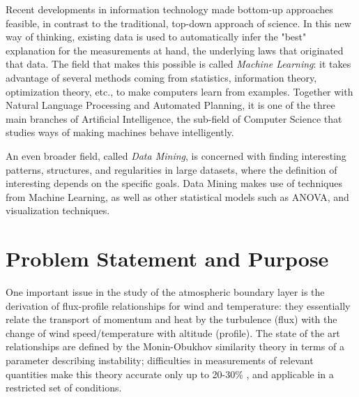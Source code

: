 \documentclass[a4paper,11pt]{kth-mag}
\begin{document}
Recent developments in information technology made bottom-up approaches feasible, in contrast to the traditional, top-down approach of science. In this new way of thinking, existing data is used to automatically infer the "best" explanation for the measurements at hand, the underlying laws that originated that data. The field that makes this possible is called \emph{Machine Learning}: it takes advantage of several methods coming from statistics, information theory, optimization theory, etc., to make computers learn from examples. Together with Natural Language Processing and Automated Planning, it is one of the three main branches of Artificial Intelligence, the sub-field of Computer Science that studies ways of making machines behave intelligently.

An even broader field, called \emph{Data Mining}, is concerned with finding interesting patterns, structures, and regularities in large datasets, where the definition of interesting depends on the specific goals. Data Mining makes use of techniques from Machine Learning, as well as other statistical models such as ANOVA, and visualization techniques.

\section{Problem Statement and Purpose}
\label{sec:problem}
One important issue in the study of the atmospheric boundary layer is the derivation of flux-profile relationships for wind and temperature: they essentially relate the transport of momentum and heat by the turbulence (flux) with the change of wind speed/temperature with altitude (profile). The state of the art relationships are defined by the Monin-Obukhov similarity theory \citep{mostayyy} in terms of a parameter describing instability; difficulties in measurements of relevant quantities make this theory accurate only up to 20-30\% \citep{basicatm}, and applicable in a restricted set of conditions.
\end{document}
